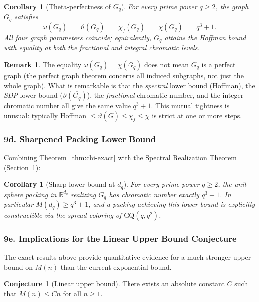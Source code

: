 \documentclass{article}
\newtheorem{corollary}[theorem]{Corollary}
\theoremstyle{definition}
\newtheorem{remark}[theorem]{Remark}
\newtheorem{conjecture}[theorem]{Conjecture}
\begin{document}
\begin{corollary}[Theta-perfectness of $G_q$]\label{cor:theta-perfect}
For every prime power $q\ge 2$, the graph $G_q$ satisfies
\[
  \omega(G_q) \;=\; \vartheta(\overline{G_q}) \;=\; \chi_f(G_q) \;=\; \chi(G_q) \;=\; q^3+1.
\]
All four graph parameters coincide; equivalently, $G_q$ attains the Hoffman bound with equality at both the fractional and integral chromatic levels.
\end{corollary}

\begin{remark}
The equality $\omega(G_q)=\chi(G_q)$ does not mean $G_q$ is a perfect graph (the perfect graph theorem concerns all induced subgraphs, not just the whole graph).  What is remarkable is that the \emph{spectral} lower bound (Hoffman), the \emph{SDP} lower bound ($\vartheta(\overline{G_q})$), the \emph{fractional} chromatic number, and the integer chromatic number all give the same value $q^3+1$.  This mutual tightness is unusual: typically Hoffman $\le\vartheta(\overline{G})\le\chi_f\le\chi$ is strict at one or more steps.
\end{remark}

\subsubsection*{9d. Sharpened Packing Lower Bound}

Combining Theorem~\ref{thm:chi-exact} with the Spectral Realization Theorem (Section~1):

\begin{corollary}[Sharp lower bound at $d_q$]\label{cor:sharp-lower}
For every prime power $q\ge 2$, the unit sphere packing in $\mathbb{R}^{d_q}$ realizing $G_q$ has chromatic number exactly $q^3+1$.  In particular $M(d_q)\ge q^3+1$, and a packing achieving this lower bound is explicitly constructible via the spread coloring of $\mathrm{GQ}(q,q^2)$.
\end{corollary}

\subsubsection*{9e. Implications for the Linear Upper Bound Conjecture}

The exact results above provide quantitative evidence for a much stronger upper bound on $M(n)$ than the current exponential bound.

\begin{conjecture}[Linear upper bound]\label{conj:linear}
There exists an absolute constant $C$ such that $M(n)\le Cn$ for all $n\ge 1$.
\end{conjecture}
\end{document}
